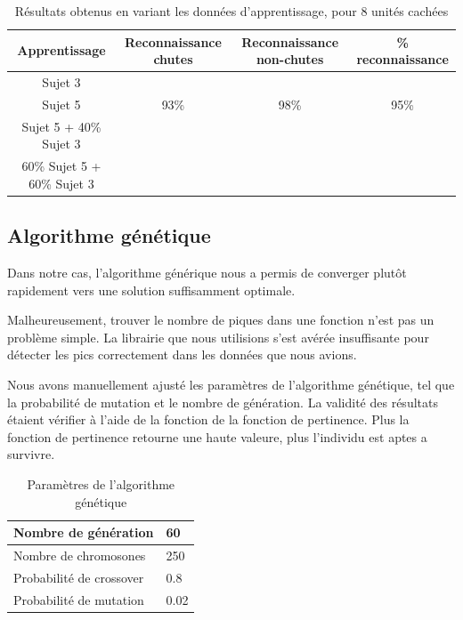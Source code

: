 \documentclass[12pt,letterpaper]{article}
\begin{document}
\begin{table}
\centering
\begin{tabular}{|c|c|c|c|}
    \hline
    Apprentissage & Reconnaissance chutes & Reconnaissance non-chutes & \% reconnaissance \\ \hline
    Sujet 3 &  &  &   \\ \hline
    Sujet 5 & 93\%  & 98\% & 95\% \\ \hline
    Sujet 5 + 40\% Sujet 3 &  &  &  \\ \hline
    60\% Sujet 5 + 60\% Sujet 3 & & & \\ \hline
\end{tabular}
\caption{Résultats obtenus en variant les données d'apprentissage, pour 8 unités cachées}
\label{tbl:neural_results_2}
\end{table}
\subsection{Algorithme génétique}

Dans notre cas, l'algorithme générique nous a permis de converger plutôt rapidement vers une solution suffisamment optimale.

Malheureusement, trouver le nombre de piques dans une fonction n'est pas un problème simple. La librairie que nous utilisions
s'est avérée insuffisante pour détecter les pics correctement dans les données que nous avions.

Nous avons manuellement ajusté les paramètres de l'algorithme génétique, tel que la probabilité de mutation et le nombre de génération.
La validité des résultats étaient vérifier à l'aide de la fonction de la fonction de pertinence. Plus la fonction de pertinence retourne
une haute valeure, plus l'individu est aptes a survivre.

\begin{table}[h]
  \begin{center}
    \begin{tabular} {|l|l|}
        \hline
        Nombre de génération & 60 \\
        \hline
        Nombre de chromosones & 250 \\
        \hline
        Probabilité de crossover & 0.8 \\
        \hline
        Probabilité de mutation & 0.02 \\
        \hline
    \end{tabular}
    \caption{Paramètres de l'algorithme génétique}
  \end{center}
\end{table}
\end{document}
